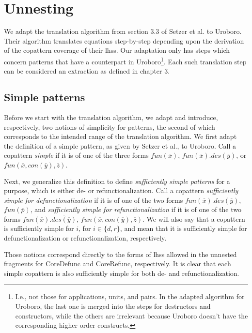 \section{Unnesting}
\label{sec:unn}

We adapt the translation algorithm from section 3.3 of Setzer et al.\cite{setzer14unnesting} to Uroboro. Their algorithm translates equations step-by-step depending upon the derivation of the copattern coverage of their lhss. Our adaptation only has steps which concern patterns that have a counterpart in Uroboro\footnote{I.e., not those for applications, units, and pairs. In the adapted algorithm for Uroboro, the last one is merged into the steps for destructors and constructors, while the others are irrelevant because Uroboro doesn't have the corresponding higher-order constructs.}. Each such translation step can be considered an extraction as defined in chapter 3.

\subsection{Simple patterns}

Before we start with the translation algorithm, we adapt and introduce, respectively, two notions of simplicity for patterns, the second of which corresponds to the intended range of the translation algorithm. We first adapt the definition of a simple pattern, as given by Setzer et al., to Uroboro. Call a copattern \textit{simple} if it is of one of the three forms $fun(\overline{x})$, $fun(\overline{x}).des(\overline{y})$, or $fun(\overline{x}, con(\overline{y}), \overline{z})$.

Next, we generalize this definition to define \textit{sufficiently simple patterns} for a purpose, which is either de- or refunctionalization. Call a copattern \textit{sufficiently simple for defunctionalization} if it is of one of the two forms $fun(\overline{x}).des(\overline{y})$, $fun(\overline{p})$, and \textit{sufficiently simple for refunctionalization} if it is of one of the two forms $fun(\overline{x}).\overline{des(\overline{y})}$, $fun(\overline{x}, con(\overline{y}), \overline{z})$. We will also say that a copattern is sufficiently simple for $i$, for $i \in \{d,r\}$, and mean that it is sufficiently simple for defunctionalization or refunctionalization, respectively.

Those notions correspond directly to the forms of lhss allowed in the unnested fragments for \textsf{CoreDefunc} and \textsf{CoreRefunc}, respectively. It is clear that each simple copattern is also sufficiently simple for both de- and refunctionalization.

